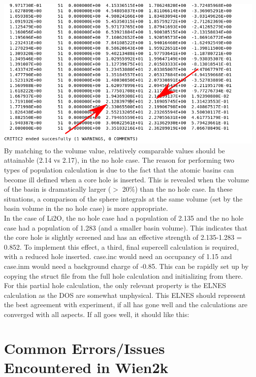 \documentclass[12pt]{article}
\begin{document}
\includegraphics[scale=0.4]{./images/spheres.png}\\ 

By matching to the volume value, relatively comparable values should be attainable (2.14 vs 2.17), in the no hole case.  The reason for performing two types of population calculation is due to the fact that the atomic basins can become ill defined when a core hole is inserted.  This is revealed when the volume of the basin is dramatically larger ($>$ 20\%) than the no hole case.  In these situations, a comparison of the sphere integrals at the same volume (set by the basin volume in the no hole case) is more appropriate.  \\

In the case of Li2O, the no hole case had a population of 2.135 and the no hole case had a population of 1.283 (and a smaller basin volume).  This indicates that the core hole is slightly screened and has an effective strength of 2.135-1.283 = 0.852.  To implement this effect, a third, final supercell calculation is required,  with a reduced hole inserted.  case.inc would need an occupancy of 1.15 and case.inm would need a background charge of -0.85. This can be rapidly set up by copying the struct file from the full hole calculation and initializing from there.\\

For this partial hole calculation, the only relevant property is the ELNES calculation as the DOS are somewhat unphysical.  This ELNES should represent the best agreement with experiment, if all has gone well and the calculations are converged with all aspects.  If all goes well, it should like this:   

  
\section{Common Errors/Issues Encountered in Wien2k}
\end{document}
